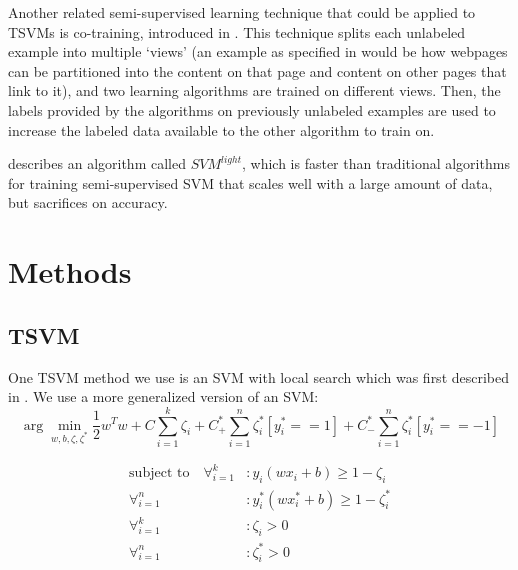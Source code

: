 \documentclass[11pt]{article}
\begin{document}
Another related semi-supervised learning technique that could
be applied to TSVMs is co-training, introduced in
\cite{blum1998combining}. This technique splits each unlabeled
example into multiple `views' (an example as specified in \cite{blum1998combining} would be how webpages can be partitioned into
the content on that page and content on other pages that link to it),
and two learning algorithms are trained on different views. Then,
the labels provided by the algorithms on previously unlabeled examples
are used to increase the labeled data available to the other
algorithm to train on.

\cite{joachims1999making} describes an algorithm called $SVM^{light}$,
which is faster than traditional algorithms for training
semi-supervised SVM that scales well with a large amount of
data, but sacrifices on accuracy.

\section{Methods}

\subsection{TSVM}

One TSVM method we use is an SVM with local search which was first described in \cite{Joachims:1999}. We use a more generalized version of an SVM:
\begin{equation}\label{eq:3}
\arg\min_{w, b, \zeta,\zeta^*} \frac{1}{2}w^Tw+C\sum_{i=1}^k\zeta_i+C^*_+\sum_{i=1}^n\zeta^*_i[y^*_i == 1]+C^*_-\sum_{i=1}^n\zeta^*_i[y^*_i == -1]
\end{equation}

\begin{align*}
\textrm{subject to}\quad \forall_{i=1}^k&: y_i(wx_i+b)\geq 1-\zeta_i \\
\forall_{i=1}^n&: y^*_i(wx^*_i+b)\geq 1-\zeta^*_i \\
\forall_{i=1}^k&: \zeta_i>0 \\
\forall_{i=1}^n&: \zeta^*_i>0
\end{align*}
\end{document}
